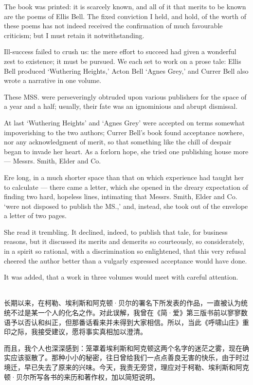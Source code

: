 {The book was printed: it is scarcely known, and all of it that merits to be known are the poems of Ellis Bell. The fixed conviction I held, and hold, of the worth of these poems has not indeed received the confirmation of much favourable criticism; but I must retain it notwithstanding.

Ill-success failed to crush us: the mere effort to succeed had given a wonderful zest to existence; it must be pursued. We each set to work on a prose tale: Ellis Bell produced ‘Wuthering Heights,’ Acton Bell ‘Agnes Grey,’ and Currer Bell also wrote a narrative in one volume.

These MSS. were perseveringly obtruded upon various publishers for the space of a year and a half; usually, their fate was an ignominious and abrupt dismissal.

At last ‘Wuthering Heights’ and ‘Agnes Grey’ were accepted on terms somewhat impoverishing to the two authors; Currer Bell’s book found acceptance nowhere, nor any acknowledgment of merit, so that something like the chill of despair began to invade her heart. As a forlorn hope, she tried one publishing house more — Messrs. Smith, Elder and Co.

Ere long, in a much shorter space than that on which experience had taught her to calculate — there came a letter, which she opened in the dreary expectation of finding two hard, hopeless lines, intimating that Messrs. Smith, Elder and Co. ‘were not disposed to publish the MS.,’ and, instead, she took out of the envelope a letter of two pages.

She read it trembling. It declined, indeed, to publish that tale, for business reasons, but it discussed its merits and demerits so courteously, so considerately, in a spirit so rational, with a discrimination so enlightened, that this very refusal cheered the author better than a vulgarly expressed acceptance would have done.

It was added, that a work in three volumes would meet with careful attention.

\\

长期以来，在柯勒、埃利斯和阿克顿·贝尔的署名下所发表的作品，一直被认为统统不过是某一个人的化名之作。对此误解，我曾在《简·爱》第三版书前以寥寥数语予以否认和纠正，但那番话看来并未得到大家相信。所以，当此《呼啸山庄》重印之际，我接受建议，愿将事实真相加以澄清。

而且，我个人也深深感到：笼罩着埃利斯和阿克顿这两个名字的迷茫之雾，现在确实应该驱散了。那种小小的秘密，往日曾给我们一点点善良无害的快乐，由于时过境迁，早已失去了原来的兴味。今天，我责无旁贷，理应对于柯勒、埃利斯和阿克顿·贝尔所写各书的来历和著作权，加以简短说明。

}
